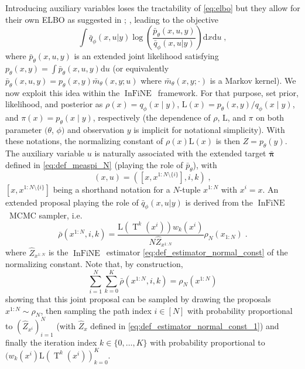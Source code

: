\documentclass{article}
\def\IFIS{\ensuremath{\operatorname{InFiNE}}}
\def\transfo{\operatorname{T}}
\def\rmd{\operatorname{d}\hspace{-2pt}}
\newcommand{\chunk}[3]{#1_{#2:#3}}
\def\rmd{\mathrm{d}}
\def\eqsp{\,}
\def\eqsp{\;}
\newcommand{\1}{\mathds{1}}
\def\w{w}
\def\target{\pi}
\def\proposal{\rho}
\newcommand{\chunku}[3]{#1^{#2:#3}}
\newcommand{\chunkum}[4]{#1^{#2:#3 \setminus \{#4\}}}
\def\const{Z}
\newcommand{\estConstC}[1]{\widehat{Z}_{#1}}
\def\measpi{\boldsymbol{\pi}}
\def\rmd{\mathrm{d}}
\def\likelihood{\mathrm{L}}
\begin{document}
Introducing auxiliary variables loses the tractability of \eqref{eq:elbo} but they allow for their own ELBO as suggested in \cite{agakov2004auxiliary}; \cite{lawson2019energy}, leading to the objective
\begin{equation}\label{eq:AVI_ELBO}
\int \bar{q}_\phi(x,u|y) \log \left( \frac{\bar{p}_\theta(x,u,y)}{\bar{q}_\phi(x,u|y)} \right)  \rmd x \rmd u \eqsp,
\end{equation}
where $\bar{p}_\theta(x,u,y)$ is an extended joint likelihood satisfying $p_\theta(x,y)= \int \bar{p}_\theta(x,u,y) \rmd u$ (or equivalently $\bar{p}_\theta(x,u,y)= p_\theta(x,y) \bar{m}_\theta(x,y; u)$ where $\bar{m}_\theta(x,y;\cdot)$ is a Markov kernel).
We now exploit this idea within the \IFIS\ framework. For that purpose, set prior, likelihood, and posterior as $\proposal(x)=q_\phi(x\mid y)$, $\likelihood(x)= p_\theta(x,y)/ q_\phi(x \mid y)$, and $\target(x)=p_{\theta}(x\mid y)$, respectively (the dependence of $\proposal$, $\likelihood$, and $\target$ on both parameter $(\theta$, $\phi)$ and observation $y$ is implicit for notational simplicity). With these notations, the normalizing constant of $\proposal(x) \likelihood(x)$ is then  $\const= p_\theta(y)$. The auxiliary variable $u$ is naturally associated with the extended target $\bar{\measpi}$ defined in \eqref{eq:def_measpi_N} (playing the role of $\bar{p}_\theta$), with
$$
(x,u)=([x,\chunkum{x}{1}{N}{i}],i,k)\eqsp,
$$
$[x,\chunkum{x}{1}{N}{i}]$ being a shorthand notation for a $N$-tuple $\chunku{x}{1}{N}$ with $x^i= x$. An extended proposal playing the role of $ \bar{q}_\phi(x,u|y)$ is derived from the \IFIS~MCMC sampler, i.e.
\begin{equation}
\label{eq:proposal-extended}
\bar{\proposal}(\chunku{x}{1}{N},i,k)=  \frac{\likelihood(\transfo^k(x^i)) \w_k(x^i)}{N \estConstC{\chunku{x}{1}{N}}} \proposal_N(\chunk{x}{1}{N})  \eqsp.
\end{equation}
where $\estConstC{\chunku{x}{1}{N}}$ is the \IFIS\ estimator \eqref{eq:def_estimator_normal_const} of the normalizing constant.
Note that, by construction, 
\begin{equation}
\label{eq:expression-marginal}
\sum_{i=1}^N \sum_{k=0}^K \bar{\proposal}(\chunku{x}{1}{N},i,k) = \proposal_N(\chunku{x}{1}{N})
\end{equation}
showing that this joint proposal can be sampled by drawing the proposals $\chunku{x}{1}{N} \sim \rho_N$, then sampling the path index $i \in [N]$ with probability proportional to $(\estConstC{x^i})_{i=1}^N$ (with $\estConstC{x}$ defined in \eqref{eq:def_estimator_normal_const_1}) and finally the iteration index $k \in \{0,\dots,K\}$ with probability proportional to $(\w_k(x^{i})\likelihood(\transfo^k(x^{i}))_{k=0}^K$.
\end{document}
